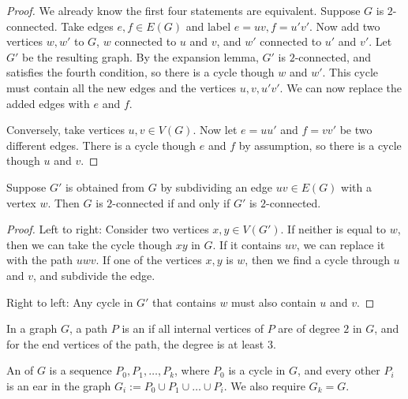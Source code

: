 \begin{proof}
  We already know the first four statements are equivalent.
  Suppose $G$ is $2$-connected.
  Take edges $e, f \in E(G)$ and label $e = uv, f = u'v'$.
  Now add two vertices $w, w'$ to $G$, $w$ connected to $u$ and $v$, and $w'$
  connected to $u'$ and $v'$.
  Let $G'$ be the resulting graph.
  By the expansion lemma, $G'$ is $2$-connected, and satisfies the fourth
  condition, so there is a cycle though $w$ and $w'$.
  This cycle must contain all the new edges and the vertices $u,v,u'v'$.
  We can now replace the added edges with $e$ and $f$.

  Conversely, take vertices $u,v \in V(G)$.
  Now let $e = uu'$ and $f = vv'$ be two different edges.
  There is a cycle though $e$ and $f$ by assumption, so there is a cycle though
  $u$ and $v$.
\end{proof}


\begin{proposition}
  Suppose $G'$ is obtained from $G$ by subdividing an edge $uv \in E(G)$ with a
  vertex $w$.
  Then $G$ is $2$-connected if and only if $G'$ is $2$-connected.
\end{proposition}

\begin{proof}
  Left to right:
  Consider two vertices $x, y \in V(G')$.
  If neither is equal to $w$, then we can take the cycle though $xy$
  in $G$.
  If it contains $uv$, we can replace it with the path $uwv$.
  If one of the vertices $x,y$ is $w$, then we find a cycle through $u$
  and $v$, and subdivide the edge.

  Right to left:
  Any cycle in $G'$ that contains $w$ must also contain $u$ and $v$.
\end{proof}



\begin{definition}
  In a graph $G$, a path $P$ is an  if all internal vertices
  of $P$ are of degree $2$ in $G$, and for the end vertices of the path, the
  degree is at least $3$.
\end{definition}

\begin{definition}
  An  of $G$ is a sequence $P_0, P_1, \ldots,
  P_k$, where $P_0$ is a cycle in $G$, and every other $P_i$ is an ear in the
  graph $G_i := P_0 \cup P_1 \cup \ldots \cup P_i$.
  We also require $G_k = G$.
\end{definition}

